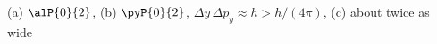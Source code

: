 (a) $\alP{0}{2}$, (b) $\pyP{0}{2}$, $\Delta y\,\Delta p_y \approx h > h/(4\pi)$, (c) about twice as wide
